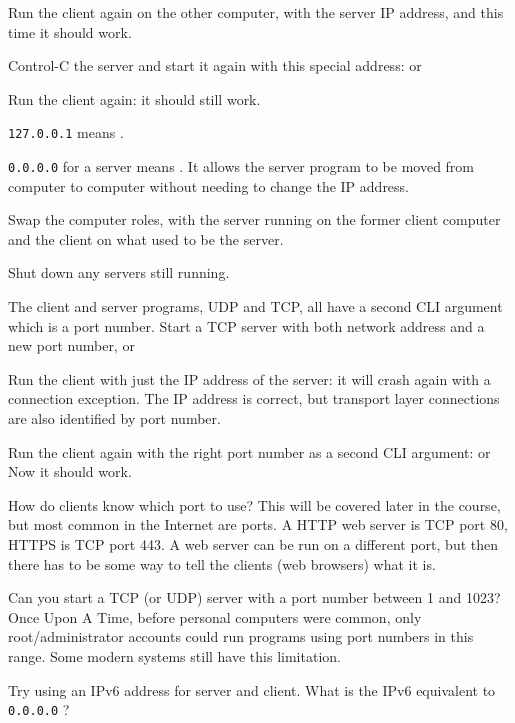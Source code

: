 Run the client again on the other computer, with the server IP address, and this time
it should work.

\STEP Control-C the server and start it again with this special address:
or

Run the client again: it should still work.

\begin{IMPORTANT}
\texttt{127.0.0.1} means .

\texttt{0.0.0.0} for a server means . It allows
the server program to be moved from computer to computer without needing to change the
IP address.
\end{IMPORTANT}

\STEP Swap the computer roles, with the server running on the former client computer and
the client on what used to be the server.



Shut down any servers still running.

\STEP The client and server programs, UDP and TCP, all have a second CLI argument which
is a port number. Start a TCP server with both network address and a new port number,
or

Run the client with just the IP address of the server: it will crash again with a
connection exception. The IP address is correct, but transport layer
connections are also identified by port number.

Run the client again with the right port number as a second CLI argument:
or
Now it should work.

How do clients know which port to use? This will be covered later in the course,
but most common in the Internet are  ports. A HTTP web server is TCP
port 80, HTTPS is TCP port 443.
A web server can be run on a different port, but then there has to be some way to
tell the clients (web browsers) what it is. 



Can you start a TCP (or UDP) server with a port number between 1 and 1023?
Once Upon A Time, before personal computers were common, only root/administrator accounts
could run programs using port numbers in this range. Some modern systems still have this
limitation.

Try using an IPv6 address for server and client. What is the IPv6 equivalent
to \texttt{0.0.0.0} ?


\COPYRIGHT


